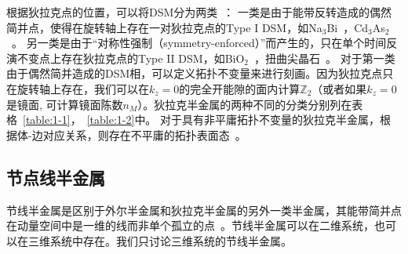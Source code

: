 根据狄拉克点的位置，可以将DSM分为两类~\citep{Yang2014}：
一类是由于能带反转造成的偶然简并点，使得在旋转轴上存在一对狄拉克点的Type I DSM，如Na$_3$Bi~\citep{wang2012dirac}，Cd$_3$As$_2$~\citep{wang2013three}。
另一类是由于“对称性强制（symmetry-enforced）”而产生的，只在单个时间反演不变点上存在狄拉克点的Type II DSM，如BiO$_2$~\citep{Young12}，扭曲尖晶石~\citep{spinels}。
对于第一类由于偶然简并造成的DSM相，可以定义拓扑不变量来进行刻画。因为狄拉克点只在旋转轴上存在，我们可以在$k_z=0$的完全开能隙的面内计算$\mathbb{Z}_2$（或者如果$k_z=0$是镜面, 可计算镜面陈数$n_M$）。狄拉克半金属的两种不同的分类分别列在表格~\ref{table:1-1}，~\ref{table:1-2}中。
对于具有非平庸拓扑不变量的狄拉克半金属，根据体-边对应关系，则存在不平庸的拓扑表面态~\citep{Yang2014}。




\subsection{节点线半金属}\label{sec:nlsm}
节线半金属是区别于外尔半金属和狄拉克半金属的另外一类半金属，其能带简并点在动量空间中是一维的线而非单个孤立的点~\citep{burkov2011}。节线半金属可以在二维系统，也可以在三维系统中存在。我们只讨论三维系统的节线半金属。

